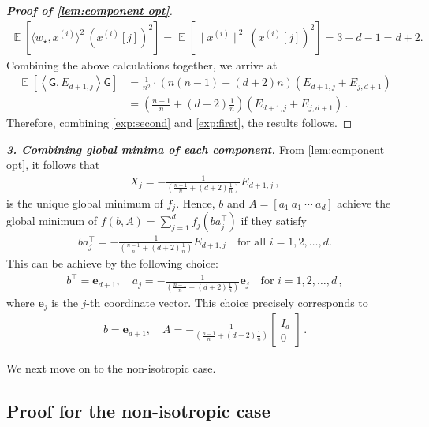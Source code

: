 \documentclass{article}
\DeclareMathOperator{\E}{\mathbb{E}}
\newcommand{\bb}{A}
\newcommand{\bbb}{a}
\newcommand{\cc}{b}
\newcommand{\wstar}{w_\star}
\newcommand{\tx}[1]{x^{(#1)}}
\newcommand{\MM}{\mathsf{G}}
\newcommand{\emphh}[1]{\textbf{\emph{#1}}}
\newcommand{\inp}[2]{\left \langle #1,#2\right\rangle}
\newcommand{\e}{\mathbf{e}}
\begin{document}
\begin{proof}[{\bf Proof of \autoref{lem:component opt}}]
\begin{align}
\E\left[\langle{\wstar}, \tx{i} \rangle^2 \ ({\tx{i}}[j])^2\right] = \E\left[ \|{\tx{i}}\|^2 \  ({\tx{i}}[j])^2 \right] = 3 +d-1 = d+2.
\end{align} 
Combining the above calculations together, we arrive at
\begin{align}
\E \left[ \inp{\MM}{E_{d+1,j}}  \MM \right]  &=   \frac{1}{n^2} \cdot \left( n(n-1) +  (d+2) n \right)  (E_{d+1,j} + E_{j,d+1})\\
&=    \left( \frac{n-1}{n} +  (d+2) \frac{1}{n} \right)    (E_{d+1,j} + E_{j,d+1})\,. \label{exp:first}
\end{align}
Therefore, combining \eqref{exp:second} and \eqref{exp:first}, the results follows. 
\end{proof}

\underline{\emphh{3. Combining global minima of each component.}} 
From \autoref{lem:component opt}, it follows that 
\begin{align}  
X_j = - \frac{1}{\left( \frac{n-1}{n} +  (d+2) \frac{1}{n} \right)}E_{d+1,j}\,,
\end{align} 
is the unique global minimum of $f_j$.
Hence, $\cc$ and $\bb = [\bbb_1\ \bbb_1 \ \cdots \ \bbb_d ]$ achieve the global minimum of $f(\cc,\bb)=\sum_{j=1}^d f_j(\cc \bbb_j^\top)$ if they satisfy
\begin{align}
\cc\bbb_j^\top =  - \frac{1}{\left( \frac{n-1}{n} +  (d+2) \frac{1}{n} \right)}E_{d+1,j} \quad \text{for all }i=1,2,\dots,d. 
\end{align}
This can be achieve by the following choice:
\begin{align}  
\cc^\top = \e_{d+1}  ,\quad \bbb_j =     -  \frac{1}{\left( \frac{n-1}{n} +  (d+2) \frac{1}{n} \right)} \e_j \quad \text{for }i=1,2,\dots,d\,,
\end{align} 
where $\e_j$ is the $j$-th coordinate vector. This choice precisely corresponds to 
\begin{align}
\cc = \e_{d+1},\quad \bb = - \frac{1}{\left( \frac{n-1}{n} +  (d+2) \frac{1}{n} \right)}  \begin{bmatrix}I_d  \\ 0 \end{bmatrix}\,.
\end{align}

We next move on to the non-isotropic case.

\subsection{Proof for the non-isotropic case}
\end{document}
